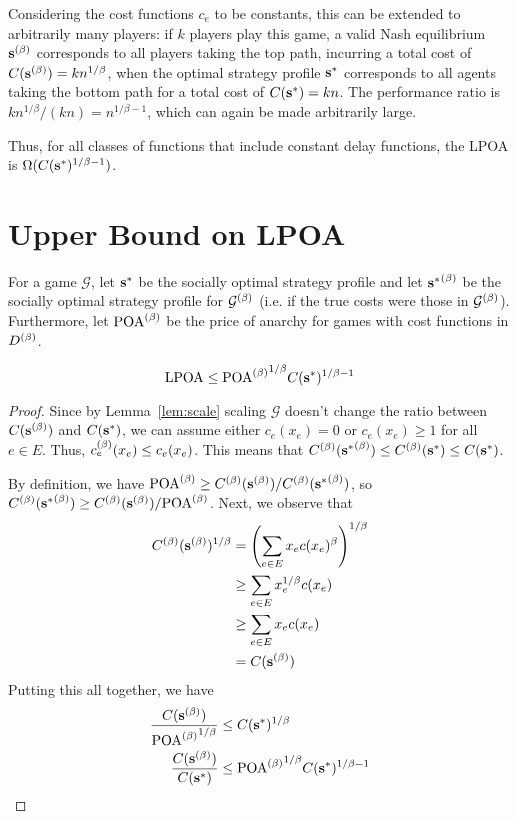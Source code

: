 \documentclass[twoside]{article}
\begin{document}
\begin{multicols}{2}
Considering the cost functions $c_e$ to be constants, this can be extended to
arbitrarily many players: if $k$ players play this game, a valid Nash
equilibrium $\mathbf{s}^{(\beta)}$ corresponds to all players taking the top path, incurring
a total cost of $C(\mathbf{s}^{(\beta)}) = kn^{1/\beta}$, when the optimal strategy profile
$\mathbf{s}^*$ corresponds to all agents taking the bottom path for a total cost of
$C(\mathbf{s}^*) = kn$. The performance ratio is $kn^{1/\beta}/(kn) = n^{1/\beta-1}$,
which can again be made arbitrarily large.

Thus, for all classes of functions that include constant delay functions, the
LPOA is $\Omega(C(\mathbf{s}^*)^{1/\beta-1})$.

\section{Upper Bound on LPOA} \label{sec:ub}
For a game $\mathcal{G}$, let $\mathbf{s}^*$ be the socially optimal strategy profile
and let ${\mathbf{s}^*}^{(\beta)}$ be the socially optimal strategy profile for
$\mathcal{G}^{(\beta)}$ (i.e. if the true costs were those in $\mathcal{G}^{(\beta)}$).
Furthermore, let $\text{POA}^{(\beta)}$ be the price of anarchy for games with cost functions in
$D^{(\beta)}$.
\begin{thm} \label{thm:lpoa}
  \[
    \text{LPOA} \le {\ensuremath{\text{POA}^{(\beta)}}}^{1/\beta} C(\mathbf{s}^*)^{1/\beta-1}
  \]
\end{thm}
\begin{proof}
  Since by Lemma~\ref{lem:scale} scaling $\mathcal{G}$ doesn't change the ratio
  between $C(\mathbf{s}^{(\beta)})$ and $C(\mathbf{s}^*)$, we can assume either $c_e(x_e) = 0$ or
  $c_e(x_e) \ge 1$ for all $e \in E$. Thus, $c_e^{(\beta)}(x_e) \le c_e(x_e)$. This
  means that $C^{(\beta)}({\mathbf{s}^*}^{(\beta)}) \le C^{(\beta)}(\mathbf{s}^*) \le C(\mathbf{s}^*)$.

  By definition, we have $\text{POA}^{(\beta)} \ge C^{(\beta)}(\mathbf{s}^{(\beta)})/C^{(\beta)}({\mathbf{s}^*}^{(\beta)})$, so
  $C^{(\beta)}({\mathbf{s}^*}^{(\beta)}) \ge C^{(\beta)}(\mathbf{s}^{(\beta)})/\text{POA}^{(\beta)}$. Next, we observe that
  \begin{align*}
    C^{(\beta)}(\mathbf{s}^{(\beta)})^{1/\beta} &= \left(\sum_{e \in E} x_e c(x_e)^\beta\right)^{1/\beta}
    \\
    &\ge \sum_{e \in E} x_e^{1/\beta} c(x_e) \\
    &\ge \sum_{e \in E} x_e c(x_e) \\
    &= C(\mathbf{s}^{(\beta)})
  \end{align*}
  Putting this all together, we have
  \begin{align*}
    \frac{C(\mathbf{s}^{(\beta)})}{{\text{POA}^{(\beta)}}^{1/\beta}} &\le C(\mathbf{s}^*)^{1/\beta} \\
    \frac{C(\mathbf{s}^{(\beta)})}{C(\mathbf{s}^*)} &\le {\ensuremath{\text{POA}^{(\beta)}}}^{1/\beta} C(\mathbf{s}^*)^{1/\beta-1}
  \end{align*}
\end{proof}



\end{multicols}
\end{document}
